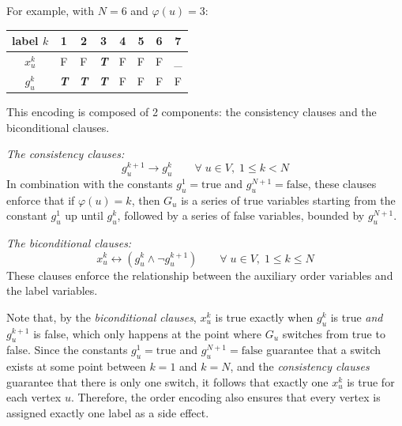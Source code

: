 \documentclass[a4paper,fleqn]{cas-sc}
\begin{document}
            For example, with $N=6$ and $\varphi(u)=3$:
            \begin{center}
                \begin{tabular}{c|ccccccc}
                    label $k$ & 1                   & 2                   & 3                   & 4 & 5 & 6 & 7  \\ \hline
                    $x_u^k$   & F                   & F                   & \textit{\textbf{T}} & F & F & F & \_ \\
                    $g_u^k$   & \textit{\textbf{T}} & \textit{\textbf{T}} & \textit{\textbf{T}} & F & F & F & F  \\
                \end{tabular}
            \end{center}

            \noindent This encoding is composed of 2 components: the consistency clauses and the biconditional clauses.

            \noindent \textit{The consistency clauses:}
            \begin{equation}
                g_u^{k+1} \rightarrow g_u^{k} \qquad \forall \; u\in V,\; 1 \le k < N
            \end{equation}
            In combination with the constants $g_u^1 = \text{true}$ and $g_u^{N+1} = \text{false}$, these clauses enforce that if $\varphi(u)=k$, then $G_u$ is a series of true variables starting from the constant $g_u^1$ up until $g_u^k$, followed by a series of false variables, bounded by $g_u^{N+1}$.

            \vspace{1em}

            \noindent \textit{The biconditional clauses:}
            \begin{equation}
                x_u^k \leftrightarrow (g_u^k \wedge \neg g_u^{k+1}) \qquad \forall \; u\in V,\; 1 \le k \le N
            \end{equation}
            These clauses enforce the relationship between the auxiliary order variables and the label variables.

            \vspace{1em}

            Note that, by the \textit{biconditional clauses}, $x_u^k$ is true exactly when $g_u^k$ is true \textit{and} $g_u^{k+1}$ is false, which only happens at the point where $G_u$ switches from true to false. Since the constants $g_u^1 = \text{true}$ and $g_u^{N+1} = \text{false}$ guarantee that a switch exists at some point between $k=1$ and $k=N$, and the \textit{consistency clauses} guarantee that there is only one switch, it follows that exactly one $x_u^k$ is true for each vertex $u$. Therefore, the order encoding also ensures that every vertex is assigned exactly one label as a side effect.
\end{document}
